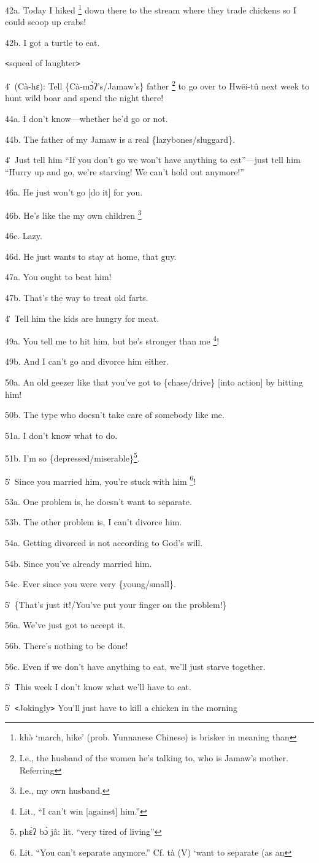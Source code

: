 42a. Today I hiked \footnote{khə̀ `march, hike' (prob. Yunnanese Chinese) is brisker in meaning than} down there to the stream where they trade chickens so I
could scoop up crabs!

42b. I got a turtle to eat.

\texttt{<}squeal of laughter\texttt{>}

4\. (Cà-hɛ): Tell \{Cà-mɔ̀ʔ's/Jamaw's\} father \footnote{I.e., the husband of the women he's talking to, who is Jamaw's mother. Referring} to go over to Hwēi-tû
next week to hunt wild boar and spend the night there!

44a. I don't know---whether he'd go or not.

44b. The father of my Jamaw is a real \{lazybones/sluggard\}.

4\. Just tell him ``If you don't go we won't have anything to eat''---just tell
him ``Hurry up and go, we're starving! We can't hold out anymore!''

46a. He just won't go [do it] for you.

46b. He's like the my own children \footnote{I.e., my own husband.}

46c. Lazy.

46d. He just wants to stay at home, that guy.

47a. You ought to beat him!

47b. That's the way to treat old farts.

4\. Tell him the kids are hungry for meat.

49a. You tell me to hit him, but he's stronger than me \footnote{Lit., ``I can't win [against] him.''}!

49b. And I can't go and divorce him either.

50a. An old geezer like that you've got to \{chase/drive\} [into action] by hitting
him!

50b. The type who doesn't take care of somebody like me.

51a. I don't know what to do.

51b. I'm so \{depressed/miserable\}\footnote{phɛ̀ʔ bɔ̀ jâ: lit. ``very tired of living''}.

5\. Since you married him, you're stuck with him \footnote{Lit. ``You can't separate anymore.'' Cf. tà (V) `want to separate (as an}!

53a. One problem is, he doesn't want to separate.

53b. The other problem is, I can't divorce him.

54a. Getting divorced is not according to God's will.

54b. Since you've already married him.

54c. Ever since you were very \{young/small\}.

5\. \{That's just it!/You've put your finger on the problem!\}

56a. We've just got to accept it.

56b. There's nothing to be done!

56c. Even if we don't have anything to eat, we'll just starve together.

5\. This week I don't know what we'll have to eat.

5\. \texttt{<}Jokingly\texttt{>} You'll just have to kill a chicken in the morning
